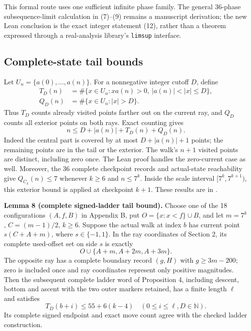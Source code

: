 \documentclass[11pt,a4paper]{article}
\begin{document}
This formal route uses one sufficient infinite phase family. The general
36-phase subsequence-limit calculation in (7)--(9) remains a manuscript
derivation; the new Lean conclusion is the exact integer statement (12),
rather than a theorem expressed through a real-analysis library's
\texttt{limsup} interface.

\subsection*{Complete-state tail bounds}
Let $U_n=\{a(0),\ldots,a(n)\}$. For a nonnegative integer cutoff $D$, define
\begin{align*}
T_D(n)&=\#\{x\in U_n:xa(n)>0,\ |a(n)|<|x|\le D\},\\
Q_D(n)&=\#\{x\in U_n:|x|>D\}.
\end{align*}
Thus $T_D$ counts already visited points farther out on the current ray,
and $Q_D$ counts all exterior points on both rays. Exact counting gives
\begin{equation*}
n\le D+|a(n)|+T_D(n)+Q_D(n). \tag{13}\label{eq:physicalcount}
\end{equation*}
Indeed the central part is covered by at most $D+|a(n)|+1$ points;
the remaining points are in the tail or the exterior. The walk's $n+1$
visited points are distinct, including zero once. The Lean proof handles
the zero-current case as well. Moreover, the 36 complete checkpoint
records and actual-state reachability give $Q_{C_k}(n)\le7$ whenever
$k\ge6$ and $n\le7^k$. Inside the scale interval
$[7^k,7^{k+1})$, this exterior bound is applied at checkpoint $k+1$.
These results are in .

\noindent\textbf{Lemma 8 (complete signed-ladder tail bound).}
Choose one of the 18 configurations $(A,f,B)$ in Appendix B, put
$O=\{x:x<f\}\cup B$, and let $m=7^k$, $C=(m-1)/2$, $k\ge6$.
Suppose the actual walk at index $b$ has current point $s(C+A+m)$,
where $s\in\{-1,1\}$. In the ray coordinates of Section 2, its complete
used-offset set on side $s$ is exactly
\[
O\cup\{A+m,A+2m,A+3m\}.
\]
The opposite ray has a complete boundary record $(g,H)$ with
$g\ge3m-200$; zero is included once and ray coordinates represent only
positive magnitudes. Then the subsequent complete ladder word of
Proposition 4, including descent, bottom and ascent with the two outer
markers retained, has a finite length $\ell$ and satisfies
\begin{equation*}
T_D(b+i)\le55+6(k-4)
\quad(0\le i\le\ell, D\in\mathbb N). \tag{14}\label{eq:laddertail}
\end{equation*}
Its complete signed endpoint and exact move count agree with the checked
ladder construction.
\end{document}
